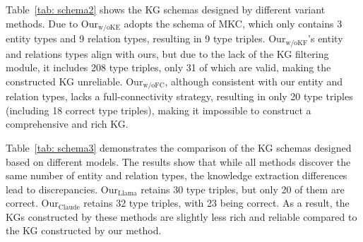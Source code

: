 Table~\ref{tab: schema2} shows the KG schemas designed by different variant methods.
Due to Our$_{\text{w/oKE}}$ adopts the schema of MKC, which only contains 3 entity types and 9 relation types, resulting in 9 type triples.
Our$_{\text{w/oKF}}$'s entity and relations types align with ours, but due to the lack of the KG filtering module, it includes 208 type triples, only 31 of which are valid, making the constructed KG unreliable.
Our$_{\text{w/oFC}}$, although consistent with our entity and relation types, lacks a full-connectivity strategy, resulting in only 20 type triples (including 18 correct type triples), making it impossible to construct a comprehensive and rich KG.

Table~\ref{tab: schema3} demonstrates the comparison of the KG schemas designed based on different models.
The results show that while all methods discover the same number of entity and relation types, the knowledge extraction differences lead to discrepancies.
Our$_{\text{Llama}}$ retains 30 type triples, but only 20 of them are correct.
Our$_{\text{Claude}}$ retains 32 type triples, with 23 being correct.
As a result, the KGs constructed by these methods are slightly less rich and reliable compared to the KG constructed by our method.

\clearpage

